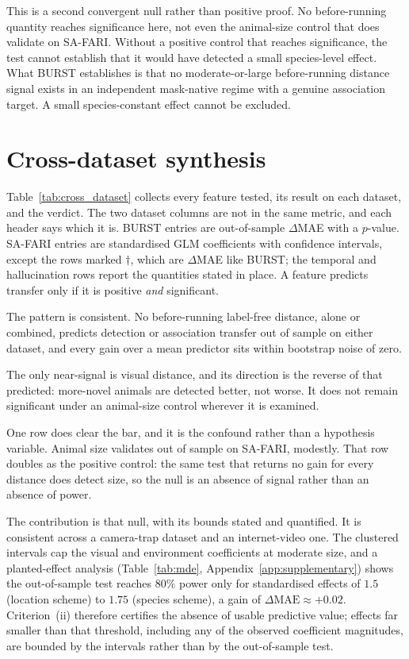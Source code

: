 This is a second convergent null rather than positive proof. No before-running quantity reaches significance
here, not even the animal-size control that does validate on SA-FARI. Without a positive control that
reaches significance, the test cannot establish that it would have detected a small species-level effect. What BURST establishes is that no
moderate-or-large before-running distance signal exists in an independent mask-native regime with a genuine
association target. A small species-constant effect cannot be excluded.

\section{Cross-dataset synthesis}
\label{sec:cross_dataset}
Table~\ref{tab:cross_dataset} collects every feature tested, its result on each dataset, and the verdict. The
two dataset columns are not in the same metric, and each header says which it is. BURST entries are
out-of-sample $\Delta$MAE with a $p$-value. SA-FARI entries are standardised GLM coefficients with
confidence intervals, except the rows marked $\dagger$, which are $\Delta$MAE like BURST; the temporal and
hallucination rows report the quantities stated in place. A feature predicts transfer only if it is positive
\emph{and} significant.

The pattern is consistent. No before-running label-free distance, alone or combined, predicts detection or
association transfer out of sample on either dataset, and every gain over a mean predictor sits within
bootstrap noise of zero.

The only near-signal is visual distance, and its direction is the reverse of that predicted: more-novel
animals are detected better, not worse. It does not remain significant under an animal-size control wherever
it is examined.

One row does clear the bar, and it is the confound rather than a hypothesis variable. Animal size validates out
of sample on SA-FARI, modestly. That row doubles as the positive control: the same test that returns no gain
for every distance does detect size, so the null is an absence of signal rather than an absence of power.

The contribution is that null, with its bounds stated and quantified. It is consistent across a camera-trap
dataset and an internet-video one. The clustered intervals cap the visual and environment coefficients at
moderate size, and a planted-effect analysis (Table~\ref{tab:mde}, Appendix~\ref{app:supplementary}) shows
the out-of-sample test reaches $80\%$ power only for standardised effects of $1.5$ (location scheme) to
$1.75$ (species scheme), a gain of $\Delta\mathrm{MAE}\approx+0.02$. Criterion~(ii) therefore certifies the
absence of usable predictive value; effects far smaller than that threshold, including any of the observed
coefficient magnitudes, are bounded by the intervals rather than by the out-of-sample test.

